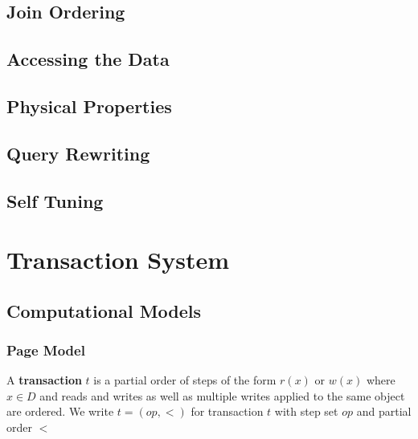 \documentclass[11pt]{article}
\begin{document}
\subsection{Join Ordering}
\label{sec:org2ecd2b7}

\subsection{Accessing the Data}
\label{sec:org53f4ca7}

\subsection{Physical Properties}
\label{sec:org43a7943}

\subsection{Query Rewriting}
\label{sec:orgcb55afa}

\subsection{Self Tuning}
\label{sec:org4b8d456}
\section{Transaction System}
\label{sec:orge9e30a6}
\subsection{Computational Models}
\label{sec:orgfffb96c}
\subsubsection{Page Model}
\label{sec:org12c0203}
\begin{definition}
A \textbf{transaction} \(t\) is a partial order of steps of the form \(r(x)\) or \(w(x)\)
where \(x\in D\) and reads and writes as well as multiple writes applied to the same object are
ordered. We write \(t=(op,<)\) for transaction \(t\) with step set \(op\) and partial order \(<\)
\end{definition}
\end{document}
